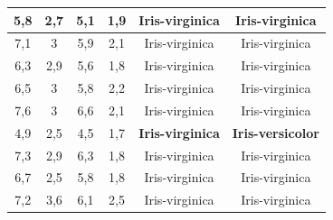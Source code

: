 \documentclass{VUMIFPSbakalaurinis}
\begin{document}
\begin{table}[]
{\begin{tabular}{|c|c|c|c|c|c|}
  5,8                  & 2,7                 & 5,1                  & 1,9                 & Iris-virginica                        & Iris-virginica                         \\ \hline
  7,1                  & 3                   & 5,9                  & 2,1                 & Iris-virginica                        & Iris-virginica                         \\ \hline
  6,3                  & 2,9                 & 5,6                  & 1,8                 & Iris-virginica                        & Iris-virginica                         \\ \hline
  6,5                  & 3                   & 5,8                  & 2,2                 & Iris-virginica                        & Iris-virginica                         \\ \hline
  7,6                  & 3                   & 6,6                  & 2,1                 & Iris-virginica                        & Iris-virginica                         \\ \hline
  4,9                  & 2,5                 & 4,5                  & 1,7                 & \textbf{Iris-virginica}               & \textbf{Iris-versicolor}               \\ \hline
  7,3                  & 2,9                 & 6,3                  & 1,8                 & Iris-virginica                        & Iris-virginica                         \\ \hline
  6,7                  & 2,5                 & 5,8                  & 1,8                 & Iris-virginica                        & Iris-virginica                         \\ \hline
  7,2                  & 3,6                 & 6,1                  & 2,5                 & Iris-virginica                        & Iris-virginica                         \\ \hline
  \end{tabular}}
  \label{tab:rezultai-2}
\end{table}
\end{document}
